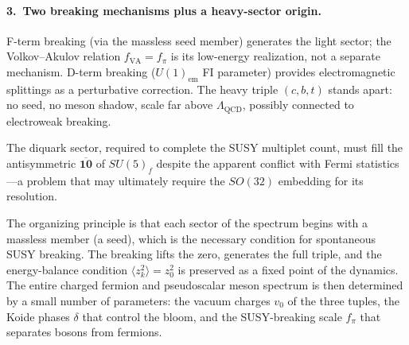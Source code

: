 \documentclass[12pt,a4paper]{article}
\begin{document}
\paragraph{3.\ Two breaking mechanisms plus a heavy-sector origin.}
F-term breaking (via the massless seed member) generates the light 
sector; the Volkov--Akulov relation $f_{\text{VA}} = f_\pi$ is its 
low-energy realization, not a separate mechanism. D-term breaking 
($U(1)_{\text{em}}$ FI parameter) provides electromagnetic 
splittings as a perturbative correction. The heavy triple 
$(c,b,t)$ stands apart: no seed, no meson shadow, scale far above 
$\Lambda_{\text{QCD}}$, possibly connected to electroweak breaking.

The diquark sector, required to complete the SUSY multiplet count, 
must fill the antisymmetric $\overline{\mathbf{10}}$ of $SU(5)_f$ 
despite the apparent conflict with Fermi statistics---a problem 
that may ultimately require the $SO(32)$ embedding for its 
resolution.

The organizing principle is that each sector of the spectrum begins 
with a massless member (a seed), which is the necessary condition 
for spontaneous SUSY breaking. The breaking lifts the zero, 
generates the full triple, and the energy-balance condition 
$\langle z_k^2\rangle = z_0^2$ is preserved as a fixed point 
of the dynamics. The entire charged fermion and pseudoscalar meson 
spectrum is then determined by a small number of parameters: the 
vacuum charges $v_0$ of the three tuples, the Koide phases 
$\delta$ that control the bloom, and the SUSY-breaking scale 
$f_\pi$ that separates bosons from fermions.
\end{document}
